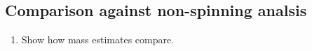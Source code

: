 \subsection{Comparison against non-spinning analsis}

\begin{enumerate}
\item Show how mass estimates compare.
\end{enumerate}
